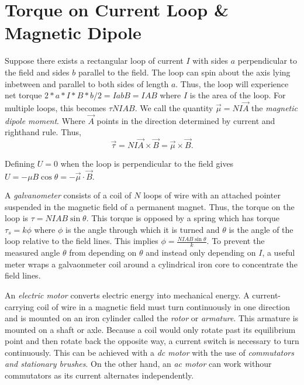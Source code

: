 \section{Torque on Current Loop \& Magnetic Dipole}

\begin{remark}
    Suppose there exists a rectangular loop of current $I$ with sides $a$ perpendicular to the field and sides $b$ parallel to the field. The loop can spin about the axis lying inbetween and parallel to both sides of length $a$. Thus, the loop will experience net torque $2 * a * I * B * b/2 = IabB = IAB$ where $I$ is the area of the loop. For multiple loops, this becomes $\tau NIAB$. We call the quantity $\vec{\mu} = NI\vec{A}$ the \emph{magnetic dipole moment}. Where $\vec{A}$ points in the direction determined by current and righthand rule. Thus, $$\vec{\tau} = NI\vec{A}\times\vec{B}=\vec{\mu}\times\vec{B}.$$
\end{remark}
\begin{remark}
    Defining $U = 0$ when the loop is perpendicular to the field gives $U = -\mu B\cos\theta = -\vec{\mu}\cdot\vec{B}.$
\end{remark}
\begin{definition}[Galvanometer]
    A \emph{galvanometer} consists of a coil of $N$ loops of wire with an attached pointer suspended in the magnetic field of a permanent magnet. Thus, the torque on the loop is $\tau = NIAB\sin\theta$. This torque is opposed by a spring which has torque $\tau_s = k\phi$ where $\phi$ is the angle through which it is turned and $\theta$ is the angle of the loop relative to the field lines. This implies $\phi = \frac{NIAB\sin\theta}{k}$. To prevent the measured angle $\theta$ from depending on $\theta$ and instead only depending on $I$, a useful meter wraps a galvaonmeter coil around a cylindrical iron core to concentrate the field lines. 
\end{definition}
\begin{definition}
    An \emph{electric motor} converts electric energy into mechanical energy. A current-carrying coil of wire in a magnetic field must turn continuously in one direction and is mounted on an iron cylinder called the \emph{rotor} or \emph{armature}. This armature is mounted on a shaft or axle. Because a coil would only rotate past its equilibrium point and then rotate back the opposite way, a current switch is necessary to turn continuously. This can be achieved with a \emph{dc motor} with the use of \emph{commutators and stationary brushes}. On the other hand, an \emph{ac motor} can work withour commutators as its current alternates independently.
\end{definition}
